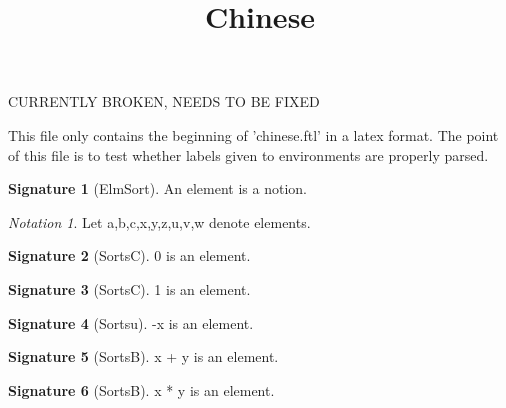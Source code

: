 \documentclass[a4paper,draft]{amsproc}
\title{\textbf{Chinese}}
\date{}
\begin{document}
\theoremstyle{plain}
 \newtheorem{ftltheorem}{Theorem}[section]
 \newtheorem{theorem}{Theorem}[section]
 \newtheorem{ftlproposition}{Proposition}[section]
 \newtheorem{ftllemma}{Lemma}[section]
 \newtheorem{ftlcorollary}{Corollary}[section]
\theoremstyle{definition}
 \newtheorem{example}{Example}[section]
 \newtheorem{ftldefinition}{Definition}[section]
 \newtheorem{signature}{Signature}[section]
\theoremstyle{remark}
 \newtheorem{remark}{Remark}[section]
 \newtheorem{notation}{Notation}[section]
\theoremstyle{axiom}
 \newtheorem{ftlaxiom}{Axiom}[section]

\newenvironment{parser}{}{}
\maketitle

CURRENTLY BROKEN, NEEDS TO BE FIXED

This file only contains the beginning of 'chinese.ftl' in a latex format. The point of this file is to test whether labels given to environments are properly parsed.

\begin{parser}[synonym element/-s]\end{parser}

\begin{signature}[ElmSort]
An element is a notion.
\end{signature}

\begin{notation}
Let a,b,c,x,y,z,u,v,w denote elements.
\end{notation}

\begin{signature}[SortsC]
0 is an element.
\end{signature}

\begin{signature}[SortsC]
1 is an element.
\end{signature}

\begin{signature}[Sortsu]
-x is an element.
\end{signature}

\begin{signature}[SortsB]
x + y is an element.
\end{signature}

\begin{signature}[SortsB]
x * y is an element.
\end{signature}
\end{document}
